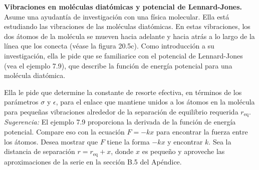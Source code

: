 \item \textbf{Vibraciones en moléculas diatómicas y potencial de Lennard-Jones.}
Asume una ayudantía de investigación con una física molecular. Ella está estudiando las vibraciones de las moléculas diatómicas. En estas vibraciones, los dos átomos de la molécula se mueven hacia adelante y hacia atrás a lo largo de la línea que los conecta (véase la figura 20.5c). Como introducción a su investigación, ella le pide que se familiarice con el potencial de Lennard-Jones (vea el ejemplo 7.9), que describe la función de energía potencial para una molécula diatómica.

Ella le pide que determine la constante de resorte efectiva, en términos de los parámetros $\sigma$ y $\epsilon$, para el enlace que mantiene unidos a los átomos en la molécula para pequeñas vibraciones alrededor de la separación de equilibrio requerida $r_{\text{eq}}$.
\textit{Sugerencia:} El ejemplo 7.9 proporciona la derivada de la función de energía potencial. Compare eso con la ecuación $F = -kx$ para encontrar la fuerza entre los átomos. Desea mostrar que $F$ tiene la forma $-kx$ y encontrar $k$. Sea la distancia de separación $r = r_{\text{eq}} + x$, donde $x$ es pequeño y aproveche las aproximaciones de la serie en la sección B.5 del Apéndice.